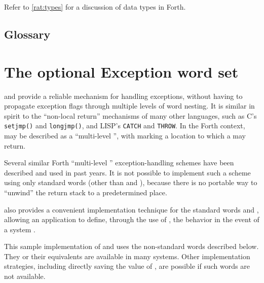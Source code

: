 Refer to \ref{rat:types} for a discussion of data types in Forth.

\setcounter{subsection}{5}
\subsection{Glossary} %



\section{The optional Exception word set} %
\label{rat:exception}

 and  provide a reliable mechanism for
handling exceptions, without having to propagate exception flags
through multiple levels of word nesting. It is similar in spirit
to the ``non-local return'' mechanisms of many other languages,
such as C's \texttt{setjmp()} and \texttt{longjmp()}, and LISP's
\texttt{CATCH} and \texttt{THROW}. In the Forth context, 
may be described as a ``multi-level '', with
 marking a location to which a  may return.

Several similar Forth ``multi-level ''
exception-handling schemes have been described and used in past years.
It is not possible to implement such a scheme using only standard words
(other than  and ), because there is no portable
way to ``unwind'' the return stack to a predetermined place.

 also provides a convenient implementation technique for
the standard words  and , allowing an
application to define, through the use of , the behavior
in the event of a system .

This sample implementation of  and  uses the
non-standard words described below.  They or their equivalents are
available in many systems.  Other implementation strategies, including
directly saving the value of , are possible if such
words are not available.

